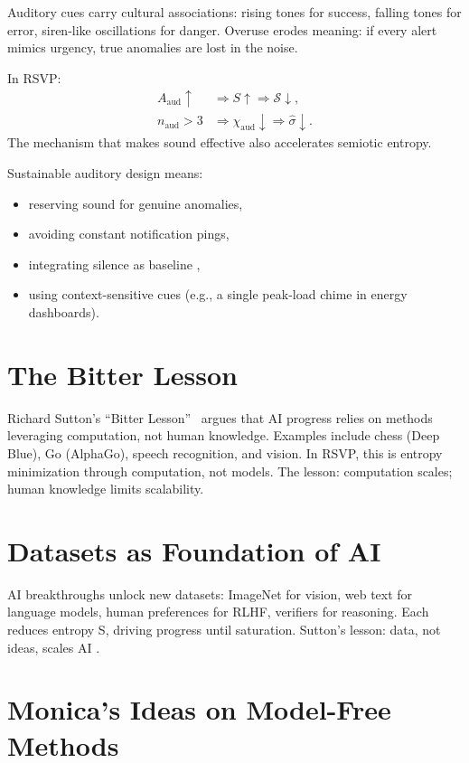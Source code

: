 \documentclass[openany]{book}
\newcommand{\PhiS}{\Phi} %
\newcommand{\Sent}{S} %
\begin{document}
Auditory cues carry cultural associations: rising tones for success, falling tones for error, siren-like oscillations for danger. Overuse erodes meaning: if every alert mimics urgency, true anomalies are lost in the noise.

In RSVP:
\begin{align}
A_{\mathrm{aud}} \uparrow &\Rightarrow \Sent \uparrow \Rightarrow \mathcal{S} \downarrow, \\
n_{\mathrm{aud}} > 3 &\Rightarrow \chi_{\mathrm{aud}} \downarrow \Rightarrow \widehat{\sigma} \downarrow.
\end{align}
The mechanism that makes sound effective also accelerates semiotic entropy.  

Sustainable auditory design means:
\begin{itemize}
  \item reserving sound for genuine anomalies,
  \item avoiding constant notification pings,
  \item integrating silence as baseline \PhiS,
  \item using context-sensitive cues (e.g., a single peak-load chime in energy dashboards).
\end{itemize}

\section{The Bitter Lesson}
\label{sec:bitter-lesson}

Richard Sutton's \textquotedblleft Bitter Lesson\textquotedblright\ \citep{sutton2019} argues that AI progress relies on methods leveraging computation, not human knowledge. Examples include chess (Deep Blue), Go (AlphaGo), speech recognition, and vision. In RSVP, this is entropy minimization through computation, not models. The lesson: computation scales; human knowledge limits scalability.

\section{Datasets as Foundation of AI}
\label{sec:datasets-foundation}

AI breakthroughs unlock new datasets: ImageNet for vision, web text for language models, human preferences for RLHF, verifiers for reasoning. Each reduces entropy \Sent, driving progress until saturation. Sutton's lesson: data, not ideas, scales AI \citep{sutton2019}.

\section{Monica's Ideas on Model-Free Methods}
\label{sec:monica-mfm}
\end{document}
